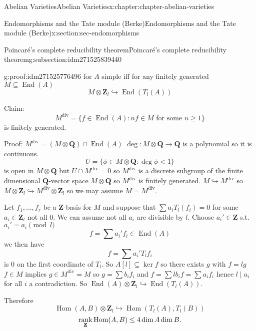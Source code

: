 \documentclass[oneside,10pt,]{book}
\newcommand{\qedhere}{\relax}
\numberwithin{equation}{section}
\newcommand{\lb}{[}
\newcommand{\rb}{]}
\newcommand{\ZZ}{\mathbf{Z}}
\newcommand{\QQ}{\mathbf{Q}}
\DeclareMathOperator{\End}{End}
\DeclareMathOperator{\Hom}{Hom}
\DeclareMathOperator{\rank}{rank}
\newcommand{\lt}{<}
\begin{document}
\begin{chapterptx}{Abelian Varieties}{}{Abelian Varieties}{}{}{x:chapter:chapter-abelian-varieties}
\begin{sectionptx}{Endomorphisms and the Tate module (Berke)}{}{Endomorphisms and the Tate module (Berke)}{}{}{x:section:sec-endomorphisms}
\begin{subsectionptx}{Poincaré's complete reducibility theorem}{}{Poincaré's complete reducibility theorem}{}{}{g:subsection:idm271525839440}
\begin{proofptx}{}{g:proof:idm271525776496}
for \(A\) simple iff for any finitely generated \(M \subseteq \End(A)\)%
\begin{equation*}
M \otimes \ZZ_l \hookrightarrow \End(T_l(A))
\end{equation*}
%
\par
Claim:%
\begin{equation*}
M^{\text{div}} = \{f\in \End(A) : nf\in M \text{ for some }n\ge 1\}
\end{equation*}
is finitely generated.%
\par
Proof: \(M^\text{div} = (M\otimes \QQ) \cap \End(A)\) \(\deg \colon M \otimes \QQ \to \QQ\) is a polynomial so it is continuous.%
\begin{equation*}
U = \{\phi\in M \otimes \QQ : \deg \phi \lt 1\}
\end{equation*}
is open in \(M \otimes \QQ\) but \(U \cap M^\text{div} = 0\) so \(M^\text{div} \) is a discrete subgroup of the finite dimensional \(\QQ\)-vector space \(M \otimes \QQ\) so \(M^\text{div}\) is finitely generated. \(M \hookrightarrow M^\text{div}\) so \(M \otimes \ZZ_l \hookrightarrow M^\text{div} \otimes \ZZ_l\) so  we may assume \(M = M^\text{div}\).%
\par
Let \(f_1,\ldots, f_r\) be a \(\ZZ\)-basis for \(M\) and suppose that \(\sum a_iT_l(f_i)=0\) for some \(a_i \in \ZZ_l\) not all 0. We can assume not all \(a_i\) are divisible by \(l\). Choose \(a_i' \in \ZZ\) s.t. \(a_i'=a_i \pmod{l}\)%
\begin{equation*}
f = \sum a_i' f_i \in \End(A)
\end{equation*}
we then have%
\begin{equation*}
f = \sum a_i' T_lf_i
\end{equation*}
is 0 on the first coordinate of \(T_l\). So \(A\lb l \rb \subseteq \ker f\) so there exists \(g\) with \(f= lg\) \(f\in M\) implies \(g\in M^\text{div} = M\) so \(g = \sum b_i f_i\) and \(f = \sum lb_i f = \sum a_i f_i\) hence \(l\mid a_i\) for all \(i\) a contradiction. So \(\End(A)\otimes \ZZ_l \hookrightarrow \End(T_l(A))\).%
\par
Therefore%
\begin{equation*}
\Hom(A,B) \otimes \ZZ_l \hookrightarrow \Hom(T_l(A), T_l(B))
\end{equation*}
%
\begin{equation*}
\rank_\ZZ \Hom(A,B) \le 4 \dim A\dim B\text{.}\qedhere
\end{equation*}
%
\end{proofptx}
\end{subsectionptx}

\end{sectionptx}
\end{chapterptx}
\end{document}

